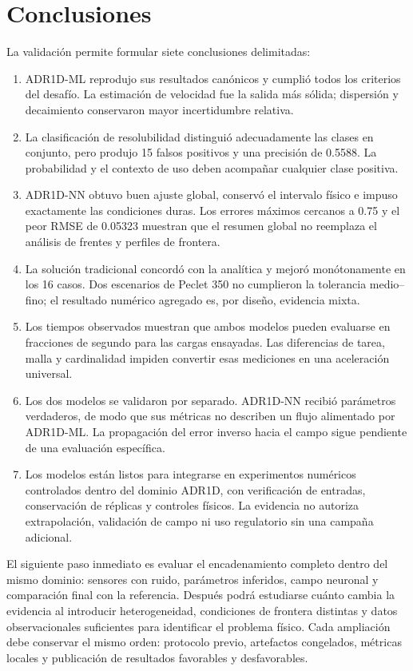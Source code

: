 \documentclass[11pt,a4paper]{article}
\begin{document}
\section{Conclusiones}

La validación permite formular siete conclusiones delimitadas:

\begin{enumerate}
    \item ADR1D-ML reprodujo sus resultados canónicos y cumplió todos los
    criterios del desafío. La estimación de velocidad fue la salida más sólida;
    dispersión y decaimiento conservaron mayor incertidumbre relativa.
    \item La clasificación de resolubilidad distinguió adecuadamente las clases
    en conjunto, pero produjo 15 falsos positivos y una precisión de 0.5588. La
    probabilidad y el contexto de uso deben acompañar cualquier clase positiva.
    \item ADR1D-NN obtuvo buen ajuste global, conservó el intervalo físico e
    impuso exactamente las condiciones duras. Los errores máximos cercanos a
    0.75 y el peor RMSE de 0.05323 muestran que el resumen global no reemplaza
    el análisis de frentes y perfiles de frontera.
    \item La solución tradicional concordó con la analítica y mejoró
    monótonamente en los 16 casos. Dos escenarios de Peclet 350 no cumplieron la
    tolerancia medio--fino; el resultado numérico agregado es, por diseño,
    evidencia mixta.
    \item Los tiempos observados muestran que ambos modelos pueden evaluarse en
    fracciones de segundo para las cargas ensayadas. Las diferencias de tarea,
    malla y cardinalidad impiden convertir esas mediciones en una aceleración
    universal.
    \item Los dos modelos se validaron por separado. ADR1D-NN recibió parámetros
    verdaderos, de modo que sus métricas no describen un flujo alimentado por
    ADR1D-ML. La propagación del error inverso hacia el campo sigue pendiente de
    una evaluación específica.
    \item Los modelos están listos para integrarse en experimentos numéricos
    controlados dentro del dominio ADR1D, con verificación de entradas,
    conservación de réplicas y controles físicos. La evidencia no autoriza
    extrapolación, validación de campo ni uso regulatorio sin una campaña
    adicional.
\end{enumerate}

El siguiente paso inmediato es evaluar el encadenamiento completo dentro del
mismo dominio: sensores con ruido, parámetros inferidos, campo neuronal y
comparación final con la referencia. Después podrá estudiarse cuánto cambia la
evidencia al introducir heterogeneidad, condiciones de frontera distintas y
datos observacionales suficientes para identificar el problema físico. Cada
ampliación debe conservar el mismo orden: protocolo previo, artefactos
congelados, métricas locales y publicación de resultados favorables y
desfavorables.
\end{document}
